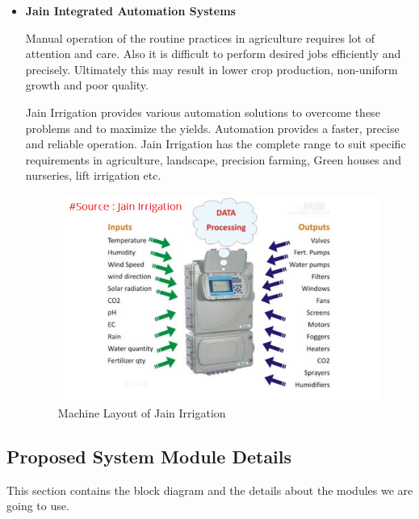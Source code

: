 \documentclass[10pt,a4paper]{article}
\begin{document}
\begin{itemize}
\item \textbf{Jain Integrated Automation Systems}

\quad 
Manual operation of the routine practices in agriculture requires lot of attention and care. Also it is difficult to perform desired jobs efficiently and precisely. Ultimately this may result in lower crop production, non-uniform growth and poor quality.

\quad
Jain Irrigation provides various automation solutions to overcome these problems and to maximize the yields. Automation provides a faster, precise and reliable operation. Jain Irrigation has the complete range to suit specific requirements in agriculture, landscape, precision farming, Green houses and nurseries, lift irrigation etc.

\begin{figure}[hbtp]
\centering
\includegraphics[scale=0.6]{jain2.PNG}
\caption{Machine Layout of Jain Irrigation}
\end{figure}

\end{itemize}



\subsection{Proposed System Module Details}

\quad
This section contains the block diagram and the details about the modules we are going to use. 
\end{document}
